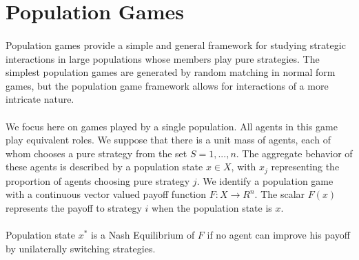 \section{Population Games}
\paragraph{}Population games provide a simple and general framework for studying strategic interactions in large populations whose members play pure strategies. The simplest population games are generated by random matching in normal form games, but the population game framework allows for interactions of a more intricate nature.
\paragraph{}We focus here on games played by a single population. All agents in this game play equivalent roles. We suppose that there is a unit mass of agents, each of whom chooses a pure strategy from the set
 $S = {1, ... , n}$. The aggregate behavior of these agents is described by a population state $x \in X$, with $x_j$ representing the proportion of agents choosing pure strategy $j$. We identify a population game with a continuous vector valued payoff function $ F:X \rightarrow R^n$. The scalar $F(x)$ represents the payoff to strategy $i$ when the population state is $x$.
\paragraph{}Population state $x^*$ is a Nash Equilibrium of $F$ if no agent can improve his payoff by unilaterally switching strategies.